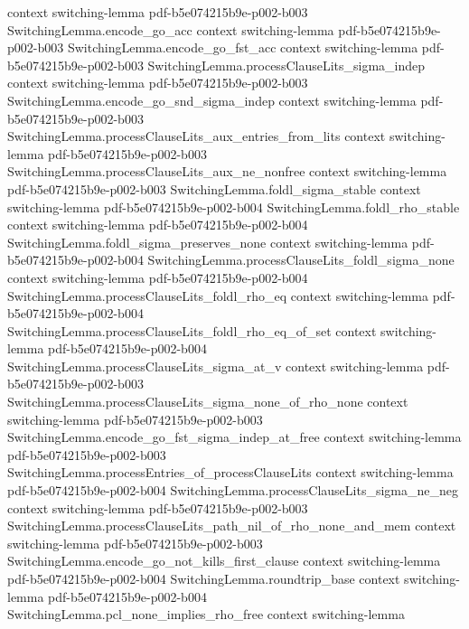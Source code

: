 \begin{lemma}
  {context}
  {switching-lemma}
  {pdf-b5e074215b9e-p002-b003}
\proofstep
  {SwitchingLemma.encode_go_acc}
  {context}
  {switching-lemma}
  {pdf-b5e074215b9e-p002-b003}
\proofstep
  {SwitchingLemma.encode_go_fst_acc}
  {context}
  {switching-lemma}
  {pdf-b5e074215b9e-p002-b003}
\proofstep
  {SwitchingLemma.processClauseLits_sigma_indep}
  {context}
  {switching-lemma}
  {pdf-b5e074215b9e-p002-b003}
\proofstep
  {SwitchingLemma.encode_go_snd_sigma_indep}
  {context}
  {switching-lemma}
  {pdf-b5e074215b9e-p002-b003}
\proofstep
  {SwitchingLemma.processClauseLits_aux_entries_from_lits}
  {context}
  {switching-lemma}
  {pdf-b5e074215b9e-p002-b003}
\proofstep
  {SwitchingLemma.processClauseLits_aux_ne_nonfree}
  {context}
  {switching-lemma}
  {pdf-b5e074215b9e-p002-b003}
\proofstep
  {SwitchingLemma.foldl_sigma_stable}
  {context}
  {switching-lemma}
  {pdf-b5e074215b9e-p002-b004}
\proofstep
  {SwitchingLemma.foldl_rho_stable}
  {context}
  {switching-lemma}
  {pdf-b5e074215b9e-p002-b004}
\proofstep
  {SwitchingLemma.foldl_sigma_preserves_none}
  {context}
  {switching-lemma}
  {pdf-b5e074215b9e-p002-b004}
\proofstep
  {SwitchingLemma.processClauseLits_foldl_sigma_none}
  {context}
  {switching-lemma}
  {pdf-b5e074215b9e-p002-b004}
\proofstep
  {SwitchingLemma.processClauseLits_foldl_rho_eq}
  {context}
  {switching-lemma}
  {pdf-b5e074215b9e-p002-b004}
\proofstep
  {SwitchingLemma.processClauseLits_foldl_rho_eq_of_set}
  {context}
  {switching-lemma}
  {pdf-b5e074215b9e-p002-b004}
\proofstep
  {SwitchingLemma.processClauseLits_sigma_at_v}
  {context}
  {switching-lemma}
  {pdf-b5e074215b9e-p002-b003}
\proofstep
  {SwitchingLemma.processClauseLits_sigma_none_of_rho_none}
  {context}
  {switching-lemma}
  {pdf-b5e074215b9e-p002-b003}
\proofstep
  {SwitchingLemma.encode_go_fst_sigma_indep_at_free}
  {context}
  {switching-lemma}
  {pdf-b5e074215b9e-p002-b003}
\proofstep
  {SwitchingLemma.processEntries_of_processClauseLits}
  {context}
  {switching-lemma}
  {pdf-b5e074215b9e-p002-b004}
\proofstep
  {SwitchingLemma.processClauseLits_sigma_ne_neg}
  {context}
  {switching-lemma}
  {pdf-b5e074215b9e-p002-b003}
\proofstep
  {SwitchingLemma.processClauseLits_path_nil_of_rho_none_and_mem}
  {context}
  {switching-lemma}
  {pdf-b5e074215b9e-p002-b003}
\proofstep
  {SwitchingLemma.encode_go_not_kills_first_clause}
  {context}
  {switching-lemma}
  {pdf-b5e074215b9e-p002-b004}
\proofstep
  {SwitchingLemma.roundtrip_base}
  {context}
  {switching-lemma}
  {pdf-b5e074215b9e-p002-b004}
\proofstep
  {SwitchingLemma.pcl_none_implies_rho_free}
  {context}
  {switching-lemma}

\end{lemma}
